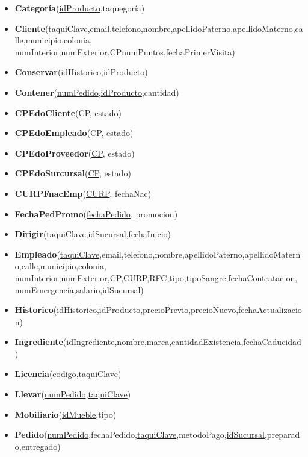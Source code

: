 \documentclass[11pt,letterpaper]{article}
\begin{document}
\begin{itemize}
\item \footnotesize{\textbf{Categoría}(\underline{idProducto},taquegoría)}
\item \footnotesize{\textbf{Cliente}(\underline{taquiClave},email,telefono,nombre,apellidoPaterno,apellidoMaterno,calle,municipio,colonia,
numInterior,numExterior,CPnumPuntos,fechaPrimerVisita)}
\item \footnotesize{\textbf{Conservar}(\underline{idHistorico},\underline{idProducto})}
\item \footnotesize{\textbf{Contener}(\underline{numPedido},\underline{idProducto},cantidad)}
\item {\footnotesize \textbf{CPEdoCliente}(\underline{CP}, estado)}
\item {\footnotesize \textbf{CPEdoEmpleado}(\underline{CP}, estado)} 
\item {\footnotesize \textbf{CPEdoProveedor}(\underline{CP}, estado) }
\item {\footnotesize \textbf{CPEdoSurcursal}(\underline{CP}, estado)}
\item{\footnotesize  \textbf{CURPFnacEmp}(\underline{CURP}, fechaNac) }
\item{\footnotesize  \textbf{FechaPedPromo}(\underline{fechaPedido}, promocion) }
\item \footnotesize{\textbf{Dirigir}(\underline{taquiClave},\underline{idSucursal},fechaInicio)}
\item \footnotesize{\textbf{Empleado}(\underline{taquiClave},email,telefono,nombre,apellidoPaterno,apellidoMaterno,calle,municipio,colonia,
numInterior,numExterior,CP,CURP,RFC,tipo,tipoSangre,fechaContratacion,
numEmergencia,salario,\underline{idSucursal})}
\item \footnotesize{\textbf{Historico}(\underline{idHistorico},idProducto,precioPrevio,precioNuevo,fechaActualizacion)}
\item \footnotesize{\textbf{Ingrediente}(\underline{idIngrediente},nombre,marca,cantidadExistencia,fechaCaducidad)}
\item \footnotesize{\textbf{Licencia}(\underline{codigo},\underline{taquiClave}})
\item \footnotesize{\textbf{Llevar}(\underline{numPedido},\underline{taquiClave})}
\item \footnotesize{\textbf{Mobiliario}(\underline{idMueble},tipo)}
\item \footnotesize{\textbf{Pedido}(\underline{numPedido},fechaPedido,\underline{taquiClave},metodoPago,\underline{idSucursal},preparado,entregado)}

\end{itemize}
\end{document}
